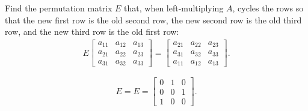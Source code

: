 \documentclass[reqno]{exam}
\begin{document}
\begin{questions}
  \question[5]
    Find the permutation matrix $E$ that, when left-multiplying $A$, cycles the rows so that the new first row is the old second row, the new second row is the old third row, and the new third row is the old first row:
    \begin{align*}
      E \begin{bmatrix}
          a_{11} & a_{12} & a_{13} \\
          a_{21} & a_{22} & a_{23} \\
          a_{31} & a_{32} & a_{33}
        \end{bmatrix}
      =
      \begin{bmatrix}
        a_{21} & a_{22} & a_{23} \\
        a_{31} & a_{32} & a_{33} \\
        a_{11} & a_{12} & a_{13}
      \end{bmatrix}.
    \end{align*}
    \begin{solution}
      $$E = E = \begin{bmatrix}
          0 & 1 & 0 \\
          0 & 0 & 1 \\
          1 & 0 & 0
        \end{bmatrix}.
      $$
    \end{solution}
    \vfill


\end{questions}
\end{document}
